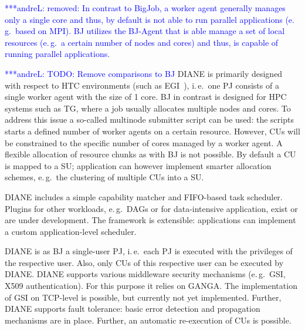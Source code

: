 \documentclass[conference,final]{IEEEtran}
\newcommand{\alnote}[1]{ {\textcolor{blue} { ***andreL: #1 }}}
\newcommand{\alnote}[1]{}
\newcommand{\cu}{CU\xspace}
\newcommand{\cus}{CUs\xspace}
\newcommand{\upp}{\vspace*{-0.5em}}
\begin{document}
\alnote{removed: In contrast to BigJob, a worker agent generally manages only a single
core and thus, by default is not able to run parallel applications (e.\,g.\
based on MPI). BJ utilizes the BJ-Agent that is able manage a set of local
resources (e.\,g.\ a certain number of nodes and cores) and thus, is capable
of running parallel applications. }


\alnote{TODO: Remove comparisons to BJ}
DIANE is primarily designed with respect to HTC environments (such as
EGI~\cite{egi}), i.\,e.\ one PJ consists of a single worker agent with the
size of 1 core. BJ in contrast is designed for HPC systems such as TG,
where a job usually allocates multiple nodes and cores. To address this issue
a so-called multinode submitter script can be used: the scripts starts a
defined number of worker agents on a certain resource. However, \cus will be
constrained to the specific number of cores managed by a worker agent. A
flexible allocation of resource chunks as with BJ is not possible. By
default a \cu  is mapped to a SU; application can however implement smarter
allocation schemes, e.\,g.\ the clustering of multiple \cus into a SU.

DIANE includes a simple capability matcher and FIFO-based task scheduler.
Plugins for other workloads, e.\,g.\ DAGs or for data-intensive
application, exist or are under development. The framework is extensible:
applications can implement a custom application-level scheduler.


DIANE is as BJ a single-user PJ, i.\,e.\ each PJ is executed with the privileges
of the respective user. Also, only \cus of this respective user can be executed
by DIANE. DIANE supports various middleware security mechanisms (e.\,g.\ GSI,
X509 authentication). For this purpose it relies on GANGA. The implementation of
GSI on TCP-level is possible, but currently not yet implemented. Further, DIANE
supports fault tolerance: basic error detection and propagation mechanisms are
in place. Further, an automatic re-execution of \cus is possible.





% 
\upp
\end{document}
